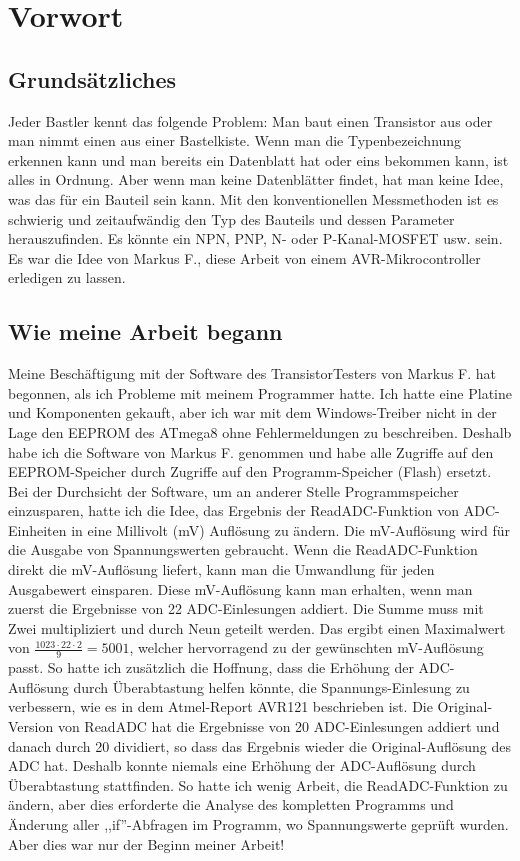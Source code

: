 \section*{Vorwort}

\subsection*{Grundsätzliches}
Jeder Bastler kennt das folgende Problem: Man baut einen Transistor aus oder man nimmt einen aus einer Bastelkiste.
Wenn man die Typenbezeichnung erkennen kann und man bereits ein Datenblatt hat oder eins bekommen kann, ist alles in Ordnung.
Aber wenn man keine Datenblätter findet, hat man keine Idee, was das für ein Bauteil sein kann.
Mit den konventionellen Messmethoden ist es schwierig und zeitaufwändig den Typ des Bauteils und dessen Parameter herauszufinden.
Es könnte ein NPN, PNP, N- oder P-Kanal-MOSFET usw. sein. 
Es war die Idee von Markus F., diese Arbeit von einem AVR-Mikrocontroller erledigen zu lassen.

\subsection*{Wie meine Arbeit begann}
Meine Beschäftigung mit der Software des TransistorTesters von Markus F. \cite{Frejek} hat begonnen, als ich Probleme mit
meinem Programmer hatte.
Ich hatte eine Platine und Komponenten gekauft, aber ich war mit dem Windows-Treiber nicht in der Lage den EEPROM des ATmega8
ohne Fehlermeldungen zu beschreiben.
Deshalb habe ich die Software von Markus F. genommen und habe alle Zugriffe auf den EEPROM-Speicher durch
Zugriffe auf den Programm-Speicher (Flash) ersetzt.
Bei der Durchsicht der Software, um an anderer Stelle Programmspeicher einzusparen, hatte ich die Idee,
das Ergebnis der ReadADC-Funktion von ADC-Einheiten in eine Millivolt (mV) Auflösung zu ändern.
Die mV-Auflösung wird für die Ausgabe von Spannungswerten gebraucht.
Wenn die ReadADC-Funktion direkt die mV-Auflösung liefert, kann man die Umwandlung für jeden Ausgabewert einsparen.
Diese mV-Auflösung kann man erhalten, wenn man zuerst die Ergebnisse von 22 ADC-Einlesungen addiert.
Die Summe muss mit Zwei multipliziert und durch Neun geteilt werden.
Das ergibt einen Maximalwert von \begin{math}\frac{1023\cdot22\cdot2}{9} = 5001\end{math},
welcher hervorragend zu der gewünschten mV-Auflösung passt.
So hatte ich zusätzlich die Hoffnung, dass die Erhöhung der ADC-Auflösung durch Überabtastung helfen
könnte, die Spannungs-Einlesung zu verbessern, wie es in dem Atmel-Report AVR121 \cite{AVR121} beschrieben ist.
Die Original-Version von ReadADC hat die Ergebnisse von 20 ADC-Einlesungen addiert und danach durch 20 dividiert,
so dass das Ergebnis wieder die Original-Auflösung des ADC hat. Deshalb konnte niemals eine Erhöhung der ADC-Auflösung
durch Überabtastung stattfinden.
So hatte ich wenig Arbeit, die ReadADC-Funktion zu ändern, aber dies erforderte die Analyse des kompletten
Programms und Änderung aller ,,if''-Abfragen im Programm, wo Spannungswerte geprüft wurden.
Aber dies war nur der Beginn meiner Arbeit!

